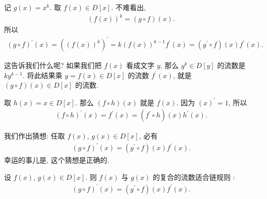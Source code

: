 记 $g(x) = x^k$. 取 $f(x) \in D[x]$. 不难看出,
\begin{align*}
    (f(x))^k = (g \circ f)(x).
\end{align*}
所以
\begin{align*}
    (g \circ f)^{\prime}(x) = ((f(x))^k)^{\prime} = k(f(x))^{k-1} f^{\prime} (x) = (g^{\prime} \circ f)(x) f^{\prime} (x).
\end{align*}

这告诉我们什么呢? 如果我们把 $f(x)$ 看成文字 $y$, 那么 $y^k \in D[y]$ 的流数是 $ky^{k-1}$. 将此结果乘 $y = f(x) \in D[x]$ 的流数 $f^{\prime} (x)$, 就是 $(g \circ f) (x) \in D[x]$ 的流数.

取 $h(x) = x \in D[x]$. 那么 $(f \circ h)(x)$ 就是 $f(x)$. 因为 $(x)^{\prime} = 1$, 所以
\begin{align*}
    (f \circ h)^{\prime} (x) = f^{\prime} (x) = (f^{\prime} \circ h) (x) h^{\prime} (x).
\end{align*}

我们作出猜想: 任取 $f(x)$, $g(x) \in D[x]$, 必有
\begin{align*}
    (g \circ f)^{\prime} (x) = (g^{\prime} \circ f)(x) f^{\prime} (x).
\end{align*}
幸运的事儿是, 这个猜想是正确的.

\begin{proposition}
    设 $f(x)$, $g(x) \in D[x]$. 则 $f(x)$ 与 $g(x)$ 的复合的流数适合链规则 :
    \begin{align*}
        (g \circ f)^{\prime} (x) = (g^{\prime} \circ f)(x) f^{\prime} (x).
    \end{align*}
\end{proposition}


